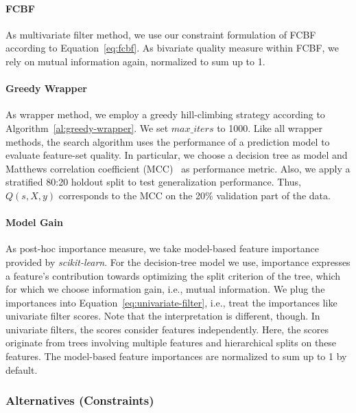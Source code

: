 \documentclass{article}
\theoremstyle{definition}
\begin{document}
\paragraph{FCBF}

As multivariate filter method, we use our constraint formulation of FCBF~\cite{yu2003feature} according to Equation~\ref{eq:fcbf}.
As bivariate quality measure within FCBF, we rely on mutual information again, normalized to sum up to 1.

\paragraph{Greedy Wrapper}

As wrapper method, we employ a greedy hill-climbing strategy according to Algorithm~\ref{al:greedy-wrapper}.
We set $max\_iters$ to 1000.
Like all wrapper methods, the search algorithm uses the performance of a prediction model to evaluate feature-set quality.
In particular, we choose a decision tree as model and Matthews correlation coefficient (MCC)~\cite{matthews1975comparison} as performance metric.
Also, we apply a stratified 80:20 holdout split to test generalization performance.
Thus, $Q(s,X,y)$ corresponds to the MCC on the 20\% validation part of the data.

\paragraph{Model Gain}

As post-hoc importance measure, we take model-based feature importance provided by \emph{scikit-learn}.
For the decision-tree model we use, importance expresses a feature's contribution towards optimizing the split criterion of the tree, which for which we choose information gain, i.e., mutual information.
We plug the importances into Equation~\ref{eq:univariate-filter}, i.e., treat the importances like univariate filter scores.
Note that the interpretation is different, though.
In univariate filters, the scores consider features independently.
Here, the scores originate from trees involving multiple features and hierarchical splits on these features.
The model-based feature importances are normalized to sum up to 1 by default.

\subsubsection{Alternatives (Constraints)}
\label{sec:experimental-design:approaches:alternatives}
\end{document}
